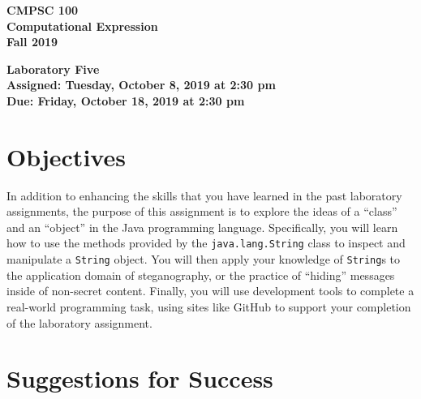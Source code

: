 \documentclass[11pt]{article}
\newcommand{\assignmentduedate}{October 18}
\newcommand{\assignmentassignedate}{October 8}
\newcommand{\assignmentnumber}{Five}
\newcommand{\labyear}{2019}
\newcommand{\labday}{Tuesday}
\newcommand{\labdueday}{Friday}
\newcommand{\labtime}{2:30 pm}
\newcommand{\assigneddate}{Assigned: \labday, \assignmentassignedate, \labyear{} at \labtime{}}
\newcommand{\duedate}{Due: \labdueday, \assignmentduedate, \labyear{} at \labtime{}}
\newcommand{\labtitle}[1]
{
  \begin{center}
    \begin{center}
      \bf
      CMPSC 100\\Computational Expression\\
      Fall 2019\\
      \medskip
    \end{center}
    \bf
    #1
  \end{center}
}
\begin{document}
\thispagestyle{empty}

\labtitle{Laboratory \assignmentnumber{} \\ \assigneddate{} \\ \duedate{}}

\section*{Objectives}

In addition to enhancing the skills that you have learned in the past laboratory
assignments, the purpose of this assignment is to explore the ideas of a
``class'' and an ``object'' in the Java programming language. Specifically, you
will learn how to use the methods provided by the {\tt java.lang.String} class
to inspect and manipulate a {\tt String} object. You will then apply your
knowledge of {\tt String}s to the application domain of steganography, or the
practice of ``hiding'' messages inside of non-secret content. Finally, you will
use development tools to complete a real-world programming task, using sites
like GitHub to support your completion of the laboratory assignment.

\section*{Suggestions for Success}
\end{document}

